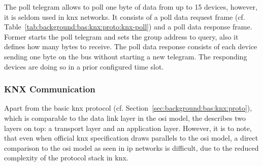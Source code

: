 The poll telegram allows to poll one byte of data from up to 15 devices, however, it is seldom used in \gls{knx} networks. It consists of a poll data request frame (cf. Table~\ref{tab:background:bas:knx:proto:knx-poll}) and a poll data response frame. Former starts the poll telegram and sets the group address to query, also it defines how many bytes to receive.
The poll data response consists of each device sending one byte on the bus without starting a new telegram. The responding devices are doing so in a prior configured time slot. \parencite{Hubner2009,DIN_EN_50090-5-2}



\subsubsection{KNX Communication}
\label{sec:background:bas:knx:communication}

Apart from the basic \gls{knx} protocol (cf. Section~\ref{sec:background:bas:knx:proto}), which is comparable to the data link layer in the \gls{osi} model, the \textcite{DIN_EN_50090-4-1} describes two layers on top: a transport layer and an application layer.
However, it is to note, that even when official \gls{knx} specification draws parallels to the \gls{osi} model, a direct comparison to the \gls{osi} model as seen in \gls{ip} networks is difficult, due to the reduced complexity of the protocol stack in \gls{knx}.

